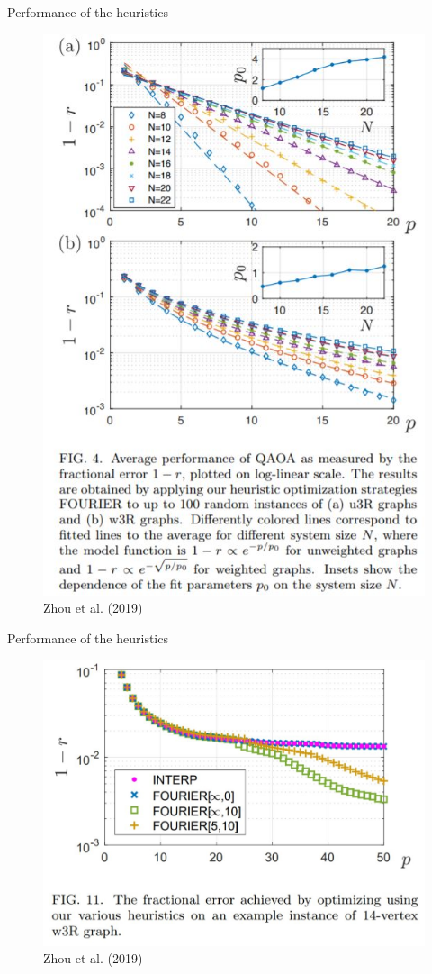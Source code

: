 \documentclass{beamer}
\begin{document}
\begin{frame}{Performance of the heuristics}
	\begin{figure}
		\includegraphics[scale=0.4]{figures/results.JPG}
		\caption{Zhou et al. (2019)}
	\end{figure}
\end{frame}

\begin{frame}{Performance of the heuristics}
\begin{figure}
	\includegraphics[scale=0.5]{figures/comparison.JPG}
	\caption{Zhou et al. (2019)}
\end{figure}
\end{frame}
\end{document}
